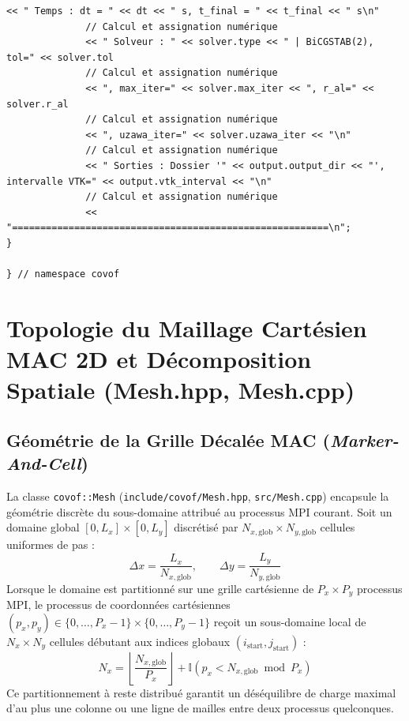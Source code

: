 \documentclass[10pt,a4paper,oneside]{book}
\begin{document}
\begin{lstlisting}[language={[11]C++}]
              << " Temps : dt = " << dt << " s, t_final = " << t_final << " s\n"
              // Calcul et assignation numérique
              << " Solveur : " << solver.type << " | BiCGSTAB(2), tol=" << solver.tol
              // Calcul et assignation numérique
              << ", max_iter=" << solver.max_iter << ", r_al=" << solver.r_al
              // Calcul et assignation numérique
              << ", uzawa_iter=" << solver.uzawa_iter << "\n"
              // Calcul et assignation numérique
              << " Sorties : Dossier '" << output.output_dir << "', intervalle VTK=" << output.vtk_interval << "\n"
              // Calcul et assignation numérique
              << "========================================================\n";
}

} // namespace covof

\end{lstlisting}

\chapter{Topologie du Maillage Cartésien MAC 2D et Décomposition Spatiale (Mesh.hpp, Mesh.cpp)}
\section{Géométrie de la Grille Décalée MAC (\emph{Marker-And-Cell})}
La classe \texttt{covof::Mesh} (\texttt{include/covof/Mesh.hpp}, \texttt{src/Mesh.cpp}) encapsule la géométrie discrète du sous-domaine attribué au processus MPI courant. Soit un domaine global $[0, L_x] \times [0, L_y]$ discrétisé par $N_{x,\text{glob}} \times N_{y,\text{glob}}$ cellules uniformes de pas :
\begin{equation}
  \Delta x = \frac{L_x}{N_{x,\text{glob}}}, \qquad \Delta y = \frac{L_y}{N_{y,\text{glob}}}
\end{equation}
Lorsque le domaine est partitionné sur une grille cartésienne de $P_x \times P_y$ processus MPI, le processus de coordonnées cartésiennes $(p_x, p_y) \in \{0, \dots, P_x-1\} \times \{0, \dots, P_y-1\}$ reçoit un sous-domaine local de $N_x \times N_y$ cellules débutant aux indices globaux $(i_{\text{start}}, j_{\text{start}})$ :
\begin{equation}
  N_x = \left\lfloor \frac{N_{x,\text{glob}}}{P_x} \right\rfloor + \mathbb{I}(p_x < N_{x,\text{glob}} \bmod P_x)
\end{equation}
Ce partitionnement à reste distribué garantit un déséquilibre de charge maximal d'au plus une colonne ou une ligne de mailles entre deux processus quelconques.
\end{document}
